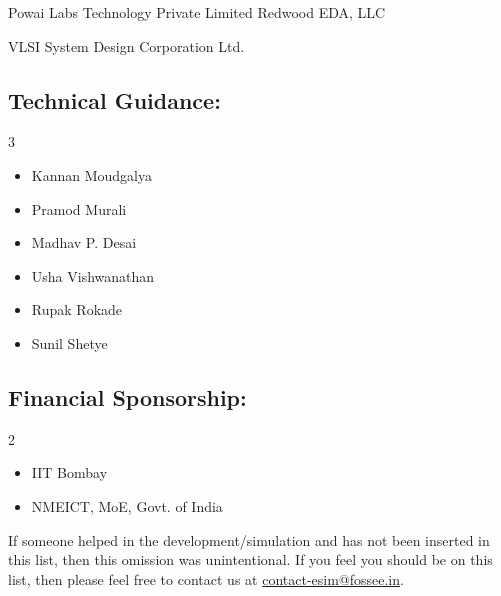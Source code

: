 \begin{tasks}[style=itemize]
    \task Powai Labs Technology Private Limited
    \task Redwood EDA, LLC
    
    \vspace{-1mm}
    
    \task* VLSI System Design Corporation Ltd.
\end{tasks}


\subsection*{Technical Guidance:}
\begin{multicols}{3}
\begin{itemize}
    \item Kannan Moudgalya
    \item Pramod Murali
    \item Madhav P. Desai
    \item Usha Vishwanathan
    \item Rupak Rokade
    \item Sunil Shetye
\end{itemize}
\end{multicols}

\subsection*{Financial Sponsorship:}
\begin{multicols}{2}
\begin{itemize}
    \item IIT Bombay
    \item NMEICT, MoE, Govt. of India
    
\end{itemize}
\end{multicols}

If someone helped in the development/simulation and has not been inserted in this list, then this omission was unintentional. If you feel you should be on this list, then please feel free to contact us at \href{mailto:contact-esim@fossee.in}{contact-esim@fossee.in}. %
